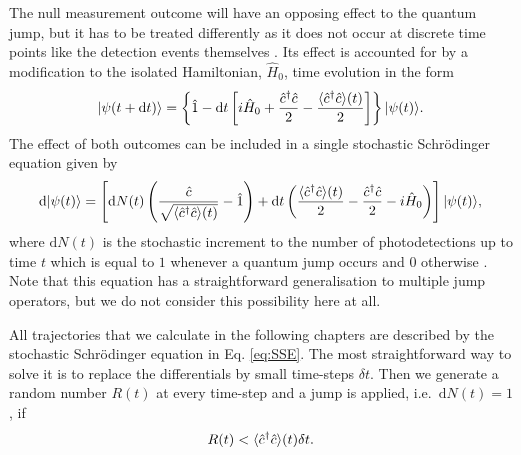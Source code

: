 The null measurement outcome will have an opposing effect to the
quantum jump, but it has to be treated differently as it does not
occur at discrete time points like the detection events themselves
\cite{MeasurementControl}. Its effect is accounted for by a
modification to the isolated Hamiltonian, $\hat{H}_0$, time evolution
in the form
\begin{equation}
  | \psi (t + \mathrm{d}t) \rangle = \left\{ \hat{1} - \mathrm{d}t
    \left[ i \hat{H}_0 + \frac{\hat{c}^\dagger \hat{c}}{2} - \frac{\langle \hat{c}^\dagger \hat{c}
        \rangle (t)}{2} \right] \right\} | \psi (t) \rangle.
\end{equation}
The effect of both outcomes can be included in a single stochastic
Schr\"{o}dinger equation given by
\begin{equation}
  \label{eq:SSE}
  \mathrm{d} | \psi(t) \rangle = \left[ \mathrm{d} N(t) \left(
      \frac{\hat{c}} {\sqrt{ \langle \hat{c}^\dagger \hat{c} \rangle (t)}} - \hat{1} \right)
    + \mathrm{d} t \left( \frac{\langle \hat{c}^\dagger \hat{c} \rangle (t)}{2} -
      \frac{ \hat{c}^\dagger \hat{c}}{2} - i \hat{H}_0 \right) \right] | \psi(t) \rangle,
\end{equation}
where $\mathrm{d}N(t)$ is the stochastic increment to the number of
photodetections up to time $t$ which is equal to $1$ whenever a
quantum jump occurs and $0$ otherwise \cite{MeasurementControl}. Note
that this equation has a straightforward generalisation to multiple
jump operators, but we do not consider this possibility here at all.

All trajectories that we calculate in the following chapters are
described by the stochastic Schr\"{o}dinger equation in
Eq. \eqref{eq:SSE}. The most straightforward way to solve it is to
replace the differentials by small time-steps $\delta t$. Then we
generate a random number $R(t)$ at every time-step and a jump is
applied, i.e.~$\mathrm{d}N(t) = 1$, if
\begin{equation}
  R(t) < \langle \hat{c}^\dagger \hat{c} \rangle (t) \delta t.
\end{equation}

